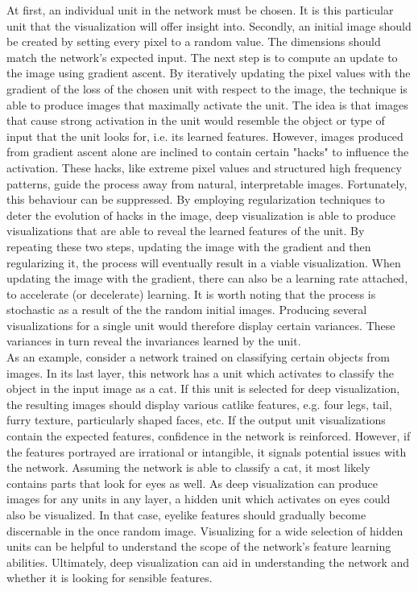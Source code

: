 \noindent At first, an individual unit in the network must be chosen. It is this particular unit that the visualization will offer insight into. Secondly, an initial image should be created by setting every pixel to a random value. The dimensions should match the network's expected input. The next step is to compute an update to the image using gradient ascent. By iteratively updating the pixel values with the gradient of the loss of the chosen unit with respect to the image, the technique is able to produce images that maximally activate the unit. The idea is that images that cause strong activation in the unit would resemble the object or type of input that the unit looks for, i.e. its learned features. However, images produced from gradient ascent alone are inclined to contain certain "hacks" to influence the activation. These hacks, like extreme pixel values and structured high frequency patterns, guide the process away from natural, interpretable images. Fortunately, this behaviour can be suppressed. By employing regularization techniques to deter the evolution of hacks in the image, deep visualization is able to produce visualizations that are able to reveal the learned features of the unit. By repeating these two steps, updating the image with the gradient and then regularizing it, the process will eventually result in a viable visualization. When updating the image with the gradient, there can also be a learning rate attached, to accelerate (or decelerate) learning. It is worth noting that the process is stochastic as a result of the the random initial images. Producing several visualizations for a single unit would therefore display certain variances. These variances in turn reveal the invariances learned by the unit. \\

\noindent As an example, consider a network trained on classifying certain objects from images. In its last layer, this network has a unit which activates to classify the object in the input image as a cat. If this unit is selected for deep visualization, the resulting images should display various catlike features, e.g. four legs, tail, furry texture, particularly shaped faces, etc. If the output unit visualizations contain the expected features, confidence in the network is reinforced. However, if the features portrayed are irrational or intangible, it signals potential issues with the network. Assuming the network is able to classify a cat, it most likely contains parts that look for eyes as well. As deep visualization can produce images for any units in any layer, a hidden unit which activates on eyes could also be visualized. In that case, eyelike features should gradually become discernable in the once random image. Visualizing for a wide selection of hidden units can be helpful to understand the scope of the network's feature learning abilities. Ultimately, deep visualization can aid in understanding the network and whether it is looking for sensible features. \\

